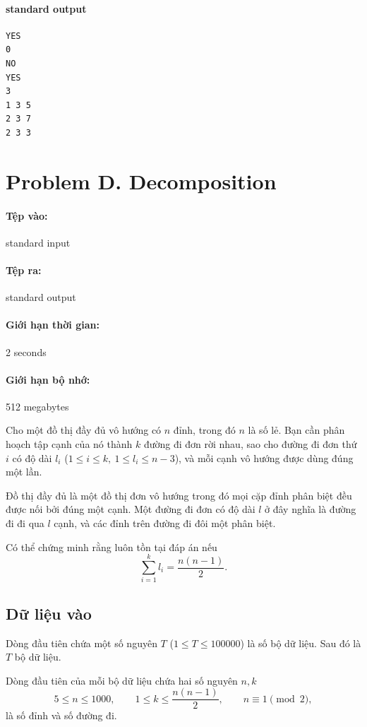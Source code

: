 \documentclass[11pt]{article}
\begin{document}
\paragraph{standard output}
\begin{verbatim}
YES
0
NO
YES
3
1 3 5
2 3 7
2 3 3
\end{verbatim}

\section{Problem D. Decomposition}

\paragraph{Tệp vào:} standard input
\paragraph{Tệp ra:} standard output
\paragraph{Giới hạn thời gian:} 2 seconds
\paragraph{Giới hạn bộ nhớ:} 512 megabytes

Cho một đồ thị đầy đủ vô hướng có \(n\) đỉnh, trong đó \(n\) là số lẻ. Bạn
cần phân hoạch tập cạnh của nó thành \(k\) đường đi đơn rời nhau, sao cho
đường đi đơn thứ \(i\) có độ dài \(l_i\) (\(1\le i\le k,\ 1\le l_i\le n-3\)),
và mỗi cạnh vô hướng được dùng đúng một lần.

Đồ thị đầy đủ là một đồ thị đơn vô hướng trong đó mọi cặp đỉnh phân biệt đều
được nối bởi đúng một cạnh. Một đường đi đơn có độ dài \(l\) ở đây nghĩa là
đường đi đi qua \(l\) cạnh, và các đỉnh trên đường đi đôi một phân biệt.

Có thể chứng minh rằng luôn tồn tại đáp án nếu
\[
  \sum_{i=1}^{k} l_i=\frac{n(n-1)}{2}.
\]

\subsection*{Dữ liệu vào}

Dòng đầu tiên chứa một số nguyên \(T\) (\(1\le T\le 100000\)) là số bộ dữ
liệu. Sau đó là \(T\) bộ dữ liệu.

Dòng đầu tiên của mỗi bộ dữ liệu chứa hai số nguyên \(n,k\)
\[
  5\le n\le 1000,\qquad
  1\le k\le \frac{n(n-1)}{2},\qquad
  n\equiv 1\pmod 2,
\]
là số đỉnh và số đường đi.
\end{document}
